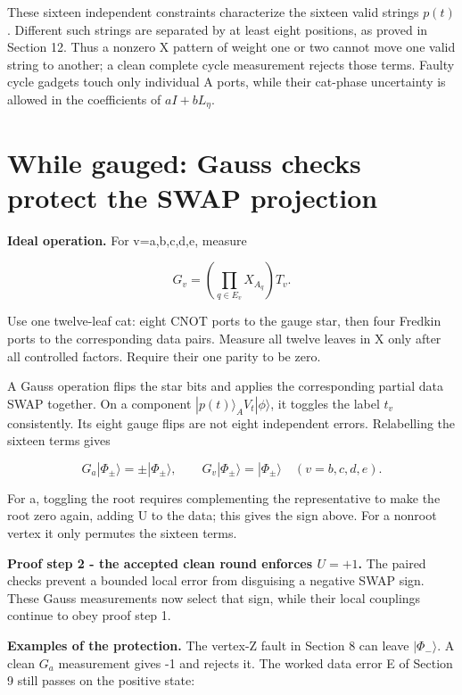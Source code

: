 \documentclass[11pt]{article}
\begin{document}
These sixteen independent constraints characterize the sixteen valid strings \(p(t)\). Different such strings are separated by at least eight positions, as proved in Section 12. Thus a nonzero X pattern of weight one or two cannot move one valid string to another; a clean complete cycle measurement rejects those terms. Faulty cycle gadgets touch only individual A ports, while their cat-phase uncertainty is allowed in the coefficients of \(aI+bL_\eta\).

\section{While gauged: Gauss checks protect the SWAP projection}
\textbf{Ideal operation.} For v=a,b,c,d,e, measure

\[
G_v=\left(\prod_{q\in E_v}X_{A_q}\right)T_v.
\]

Use one twelve-leaf cat: eight CNOT ports to the gauge star, then four Fredkin ports to the corresponding data pairs. Measure all twelve leaves in X only after all controlled factors. Require their one parity to be zero.

\begin{center}\begin{minipage}{\linewidth}

\end{minipage}\end{center}

A Gauss operation flips the star bits and applies the corresponding partial data SWAP together. On a component \(|p(t)\rangle_A V_t|\phi\rangle\), it toggles the label \(t_v\) consistently. Its eight gauge flips are not eight independent errors. Relabelling the sixteen terms gives

\[
G_a|\Phi_\pm\rangle=\pm|\Phi_\pm\rangle,\qquad
G_v|\Phi_\pm\rangle=|\Phi_\pm\rangle\quad(v=b,c,d,e).
\]

For a, toggling the root requires complementing the representative to make the root zero again, adding U to the data; this gives the sign above. For a nonroot vertex it only permutes the sixteen terms.

\textbf{Proof step 2 - the accepted clean round enforces \(U=+1\).} The paired checks prevent a bounded local error from disguising a negative SWAP sign. These Gauss measurements now select that sign, while their local couplings continue to obey proof step 1.

\textbf{Examples of the protection.} The vertex-Z fault in Section 8 can leave \(|\Phi_-\rangle\). A clean \(G_a\) measurement gives -1 and rejects it. The worked data error E of Section 9 still passes on the positive state:
\end{document}
